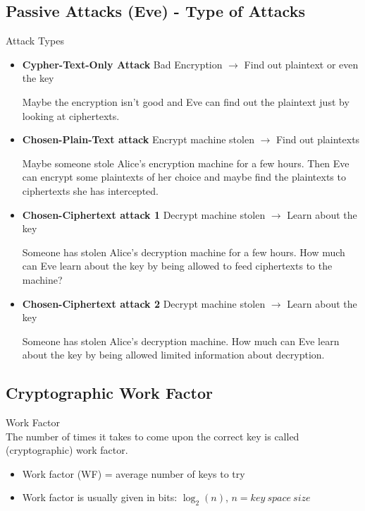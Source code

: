 
\subsection{Passive Attacks (Eve) - Type of Attacks}

\begin{definition}{Attack Types}\\
    \begin{itemize}
        \item \textbf{Cypher-Text-Only Attack} Bad Encryption $\rightarrow$ Find out plaintext or even the key
        
        Maybe the encryption isn't good and Eve can find out the plaintext just by looking at ciphertexts.
        
        \item \textbf{Chosen-Plain-Text attack} Encrypt machine stolen $\rightarrow$ Find out plaintexts
        
        Maybe someone stole Alice's encryption machine for a few hours. Then Eve can encrypt some plaintexts of her choice and maybe find the plaintexts to ciphertexts she has intercepted.
        
        \item \textbf{Chosen-Ciphertext attack 1} Decrypt machine stolen $\rightarrow$ Learn about the key
        
        Someone has stolen Alice's decryption machine for a few hours. How much can Eve learn about the key by being allowed to feed ciphertexts to the machine?
        
        \item \textbf{Chosen-Ciphertext attack 2} Decrypt machine stolen $\rightarrow$ Learn about the key
        
        Someone has stolen Alice's decryption machine. How much can Eve learn about the key by being allowed limited information about decryption.
    \end{itemize}
\end{definition}

\subsection{Cryptographic Work Factor}

\begin{definition}{Work Factor}\\
    The number of times it takes to come upon the correct key is called (cryptographic) work factor.
    \begin{itemize}
        \item Work factor (WF) = average number of keys to try
        \item Work factor is usually given in bits: $\log_2(n)$, $n = key\ space\ size$
    \end{itemize}
\end{definition}

